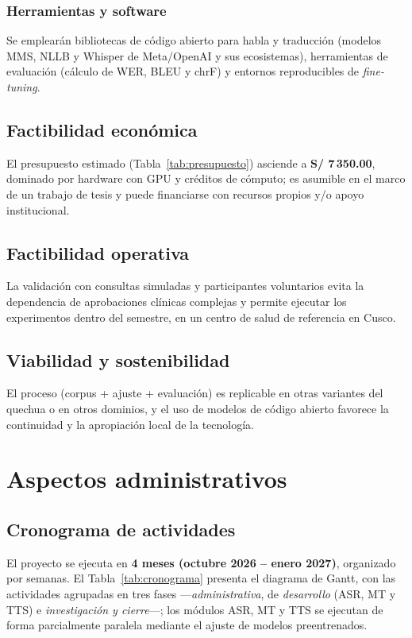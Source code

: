 \documentclass[12pt,a4paper]{article}
\begin{document}
\subsubsection{Herramientas y software}
Se emplear{\'a}n bibliotecas de c{\'o}digo abierto para habla y traducci{\'o}n (modelos MMS, NLLB y
Whisper de Meta/OpenAI y sus ecosistemas), herramientas de evaluaci{\'o}n (c{\'a}lculo de WER, BLEU y
chrF) y entornos reproducibles de \emph{fine-tuning}.

\subsection{Factibilidad econ{\'o}mica}
El presupuesto estimado (Tabla~\ref{tab:presupuesto}) asciende a \textbf{S/ 7\,350.00}, dominado por
hardware con GPU y cr{\'e}ditos de c{\'o}mputo; es asumible en el marco de un trabajo de tesis y
puede financiarse con recursos propios y/o apoyo institucional.

\subsection{Factibilidad operativa}
La validaci{\'o}n con consultas simuladas y participantes voluntarios evita la dependencia de
aprobaciones cl{\'i}nicas complejas y permite ejecutar los experimentos dentro del semestre, en un
centro de salud de referencia en Cusco.

\subsection{Viabilidad y sostenibilidad}
El proceso (corpus + ajuste + evaluaci{\'o}n) es replicable en otras variantes del quechua o en otros
dominios, y el uso de modelos de c{\'o}digo abierto favorece la continuidad y la apropiaci{\'o}n local
de la tecnolog{\'i}a.

\clearpage
\section{Aspectos administrativos}

\subsection{Cronograma de actividades}
El proyecto se ejecuta en \textbf{4 meses (octubre 2026 -- enero 2027)}, organizado por semanas. El
Tabla~\ref{tab:cronograma} presenta el diagrama de Gantt, con las actividades agrupadas en tres fases
---\emph{administrativa}, de \emph{desarrollo} (ASR, MT y TTS) e \emph{investigaci{\'o}n y cierre}---;
los m{\'o}dulos ASR, MT y TTS se ejecutan de forma parcialmente paralela mediante el ajuste de modelos
preentrenados.
\end{document}

